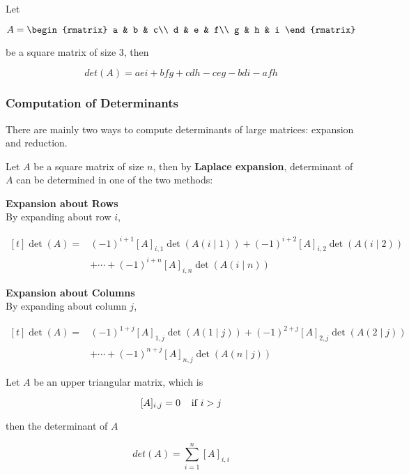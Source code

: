 \documentclass[a4paper,12pt]{article}
\begin{document}
\begin{thm}
  Let

  $$A=\begin{rmatrix}
    a & b & c\\
    d & e & f\\
    g & h & i
  \end{rmatrix}$$\s

  be a square matrix of size $3$, then
  
  $$det(A)=aei+bfg+cdh-ceg-bdi-afh$$\s
\end{thm}

\subsubsection{Computation of Determinants}
There are mainly two ways to compute determinants of large matrices: expansion and reduction.\n

\begin{thm}
  Let $A$ be a square matrix of size $n$, then by \textbf{Laplace expansion}, determinant of $A$ can be determined in one of the two methods:

  \begin{alist}
    \item \textbf{Expansion about Rows}\\
    By expanding about row $i$,
  
    $$\begin{aligned}[t]
      \det(A)=&(-1)^{i+1}[A]_{i,1}\det(A(i\!\mid\!1))+(-1)^{i+2}[A]_{i,2}\det(A(i\!\mid\!2))\\
      &+\cdots+(-1)^{i+n}[A]_{i,n}\det(A(i\!\mid\!n))
    \end{aligned}$$
  
    \item \textbf{Expansion about Columns}\\
    By expanding about column $j$,
  
    $$\begin{aligned}[t]
      \det(A)=&(-1)^{1+j}[A]_{1,j}\det(A(1\!\mid\!j))+(-1)^{2+j}[A]_{2,j}\det(A(2\!\mid\!j))\\
      &+\cdots+(-1)^{n+j}[A]_{n,j}\det(A(n\!\mid\!j))
    \end{aligned}$$
  
  \end{alist}
\end{thm}\n

\begin{thm}
  Let $A$ be an upper triangular matrix, which is

  $$[A]_{i,j}=0\;\;\;\;\text{if }i>j$$\s

  then the determinant of $A$

  $$det(A)=\sum_{i=1}^{n}[A]_{i,i}$$
\end{thm}\n
\end{document}

